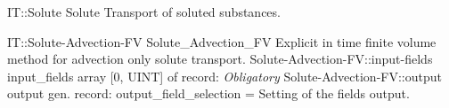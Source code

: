 \begin{AbstractType}
	{IT::Solute}
	{Solute}
	{}
	{{{Transport of soluted  substances.}%
}}
\end{AbstractType}
\begin{RecordType}
	{IT::Solute-Advection-FV}
	{Solute{\_}Advection{\_}FV}
	{}%
	{}%
	{{{Explicit in time finite volume method for advection only solute transport.}%
}}
		\RecKey
			{Solute-Advection-FV::input-fields}
			{input{\_}fields}
			{{array [0, UINT] of }{record: }}{}
			{ \it{Obligatory}}
			{}
		\RecKey
			{Solute-Advection-FV::output}
			{output}
			{{gen. record: }}{{output{\_}field{\_}selection}{ = }}
			{ }
			{{{Setting of the fields output.}%
}}
\end{RecordType}
